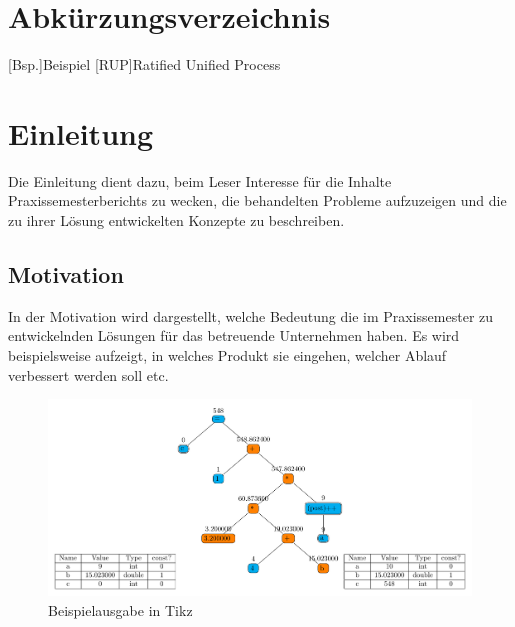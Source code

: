 \documentclass[oneside]{ausarbeitung}
\begin{document}
\listoffigures

\listoftables

\chapter*{Abkürzungsverzeichnis}
\begin{acronym}[ANSI C / C89]  %

[Bsp.]{Beispiel}
[RUP]{Ratified Unified Process}
\end{acronym}
\cleardoublepage
{}
\setcounter{page}{1}

\chapter{Einleitung}
\label{cha:einleitung}

Die Einleitung dient dazu, beim Leser Interesse für die Inhalte 
Praxissemesterberichts zu wecken, die behandelten Probleme aufzuzeigen 
und die zu ihrer Lösung entwickelten Konzepte zu beschreiben.

\section{Motivation}
\label{sec:motivation}

In der Motivation wird dargestellt, welche Bedeutung die im 
Praxissemester zu entwickelnden Lösungen für das betreuende Unternehmen 
haben. Es wird beispielsweise aufzeigt, in welches Produkt sie eingehen, 
welcher Ablauf verbessert werden soll etc.

\begin{figure}[htbp]
  \centering
  \includegraphics[width=0.8\textheight]{images/tree.pdf}
  \caption{Beispielausgabe in Tikz}
  \label{fig:motivation}
\end{figure}
\end{document}
